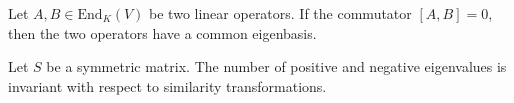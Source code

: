         \begin{property}
			Let $A, B \in \text{End}_K(V)$ be two linear operators. If the commutator $[A, B] = 0$, then the two operators have a common eigenbasis.
		\end{property}
        
        \begin{theorem}
        	Let $S$ be a symmetric matrix. The number of positive and negative eigenvalues is invariant with respect to similarity transformations\footnotemark.
        \end{theorem}
